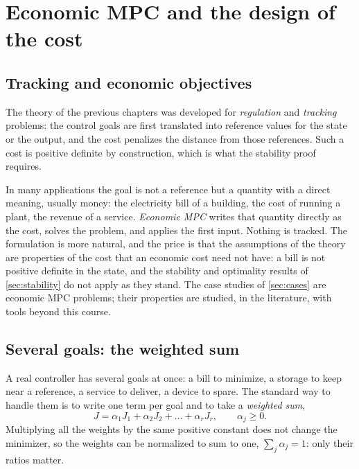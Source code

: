 \section{Economic MPC and the design of the cost}
\label{sec:economic}

\subsection{Tracking and economic objectives}

The theory of the previous chapters was developed for \emph{regulation} and \emph{tracking}
problems: the control goals are first translated into reference values for the state or the
output, and the cost penalizes the distance from those references. Such a cost is positive
definite by construction, which is what the stability proof requires.

In many applications the goal is not a reference but a quantity with a direct meaning, usually
money: the electricity bill of a building, the cost of running a plant, the revenue of a service.
\emph{Economic MPC} writes that quantity directly as the cost, solves the problem, and applies
the first input. Nothing is tracked. The formulation is more natural, and the price is that the
assumptions of the theory are properties of the cost that an economic cost need not have: a bill
is not positive definite in the state, and the stability and optimality results of
\cref{sec:stability} do not apply as they stand. The case studies of \cref{sec:cases} are economic
MPC problems; their properties are studied, in the literature, with tools beyond this course.

\subsection{Several goals: the weighted sum}

A real controller has several goals at once: a bill to minimize, a storage to keep near a
reference, a service to deliver, a device to spare. The standard way to handle them is to write
one term per goal and to take a \emph{weighted sum},
\begin{equation}
  J = \alpha_1 J_1 + \alpha_2 J_2 + \dots + \alpha_r J_r, \qquad \alpha_j \ge 0 .
  \label{eq:weighted}
\end{equation}
Multiplying all the weights by the same positive constant does not change the minimizer, so
the weights can be normalized to sum to one, $\sum_j \alpha_j = 1$: only their ratios matter.

